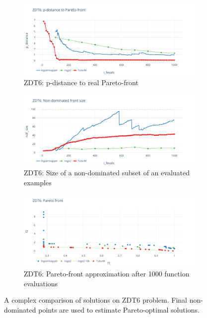     \begin{figure}
        \centering
        \begin{subfigure}{\textwidth}
            \includegraphics[width=\textwidth]{content/images/zdt6_dist}
            \caption{ZDT6: p-distance to real Pareto-front}
            \label{fig:zdt6_dist}
        \end{subfigure} 
        
        \begin{subfigure}{\textwidth}
            \includegraphics[width=\textwidth]{content/images/zdt6_ndf}
            \caption{ZDT6: Size of a non-dominated subset of an evaluated examples}
            \label{fig:zdt6_ndf}
        \end{subfigure} 

        \begin{subfigure}{\textwidth}
            \includegraphics[width=\textwidth]{content/images/zdt6_front}
            \caption{ZDT6: Pareto-front approximation after 1000 function evaluations}
            \label{fig:zdt6_front}
        \end{subfigure} 

        \caption[Comparison of solutions on ZDT6 problem]{A complex comparison of solutions on ZDT6 problem. Final non-dominated points are used to estimate Pareto-optimal solutions.}
        \label{fig:changing_models}    
    \end{figure}


